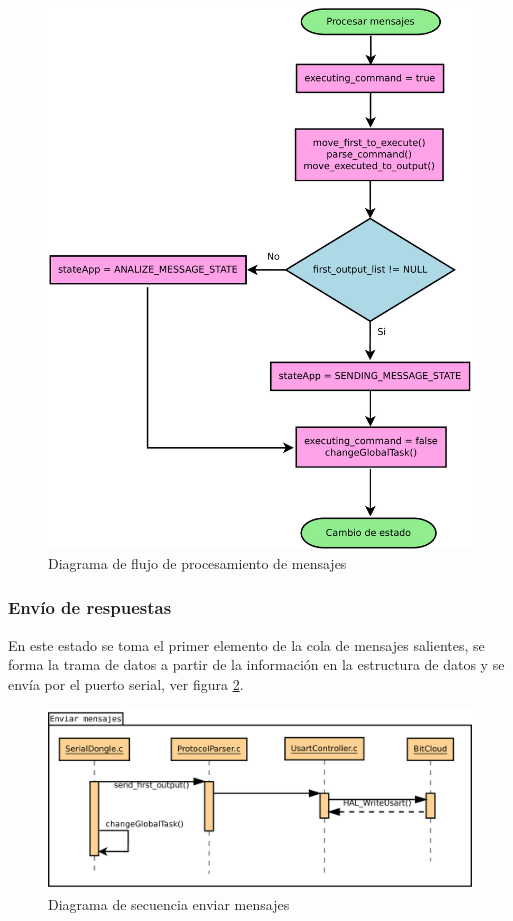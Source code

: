 \begin{figure}
	\centering
	\includegraphics[scale=0.35]{capitulo_3_imgs/procesar_mensaje_flujo.pdf}
	\caption{Diagrama de flujo de procesamiento de mensajes}
	\label{fig:diagrama_flujo_procesamiento}
\end{figure}

\subsubsection{Envío de respuestas}

En este estado se toma el primer elemento de la cola de mensajes salientes, se forma la trama de datos a partir de la información en la estructura de datos y se envía por el puerto serial, ver figura \ref{fig:diagrama_enviar_secuencia}. 

\begin{figure}
	\centering
	\includegraphics[scale=0.35]{capitulo_3_imgs/enviar_mensajes_secuencia.pdf}
	\caption{Diagrama de secuencia enviar mensajes}
	\label{fig:diagrama_enviar_secuencia}
\end{figure}


